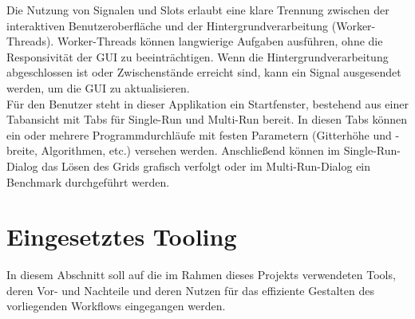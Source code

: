 Die Nutzung von Signalen und Slots erlaubt eine klare Trennung zwischen der interaktiven Benutzeroberfläche und der Hintergrundverarbeitung (Worker-Threads).
Worker-Threads können langwierige Aufgaben ausführen, ohne die Responsivität der GUI zu beeinträchtigen.
Wenn die Hintergrundverarbeitung abgeschlossen ist oder Zwischenstände erreicht sind, kann ein Signal ausgesendet werden, um die GUI zu aktualisieren. \cite{Qt52024}\\
Für den Benutzer steht in dieser Applikation ein Startfenster, bestehend aus einer Tabansicht mit Tabs für Single-Run und Multi-Run bereit.
In diesen Tabs können ein oder mehrere Programmdurchläufe mit festen Parametern (Gitterhöhe und -breite, Algorithmen, etc.) versehen werden.
Anschließend können im Single-Run-Dialog das Lösen des Grids grafisch verfolgt oder im Multi-Run-Dialog ein Benchmark durchgeführt werden.

\chapter{Eingesetztes Tooling}
\label{ch:tooling}
In diesem Abschnitt soll auf die im Rahmen dieses Projekts verwendeten Tools, deren Vor- und Nachteile und deren Nutzen für das effiziente Gestalten des vorliegenden Workflows eingegangen werden.
